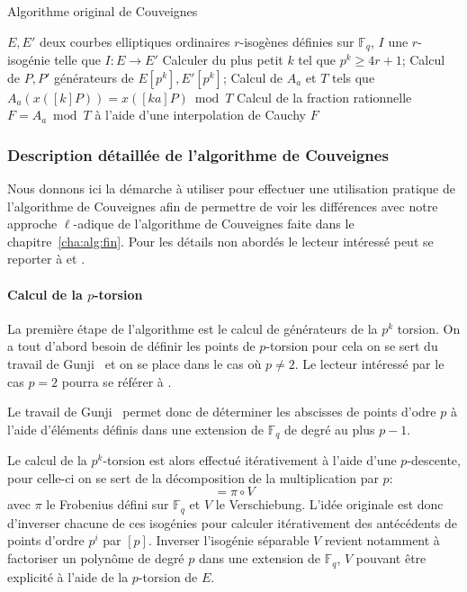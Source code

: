 \documentclass[10pt,a4paper]{book}
\theoremstyle{plain}
\theoremstyle{definition}
\theoremstyle{definition}
\theoremstyle{definition}
\theoremstyle{definition}
\theoremstyle{definition}
\theoremstyle{remark}
\theoremstyle{remark}
\theoremstyle{definition}
\begin{document}
\begin{algorithm}
\caption{\label{alg:orig:Couv} Algorithme original de Couveignes}
\begin{algorithmic}[1]
\REQUIRE $E,E'$ deux courbes elliptiques ordinaires $r$-isogènes définies sur $\mathbb{F}_q$,%
\ENSURE $I$ une $r$-isogénie telle que $I:E \rightarrow E'$
\STATE Calculer du plus petit $k$ tel que $p^k \geqslant 4r+1$;
\STATE Calcul de $P,P'$ générateurs de $E[p^k],E'[p^k]$;
\STATE Calcul de $A_a$ et $T$ tels que $A_a(x([k]P))=x([ka]P) \bmod T$
\STATE Calcul de la fraction rationnelle $F=A_a \bmod T$ à l'aide d'une 
interpolation de Cauchy
\RETURN $F$
\ENDIF
\ENDFOR
\end{algorithmic}
\end{algorithm}

\subsubsection{Description détaillée de l'algorithme de Couveignes }
Nous donnons ici la démarche à utiliser pour effectuer une utilisation 
pratique de l'algorithme de Couveignes afin de permettre de voir les différences
avec notre approche $\ell$-adique de l'algorithme de Couveignes faite dans le
chapitre~\ref{cha:alg:fin}. Pour les détails non abordés le lecteur intéressé 
peut se reporter à \cite{Couveignes96} et \cite{DeFeo11}.

\paragraph{Calcul de la $p$-torsion}
La première étape de l'algorithme est le calcul de générateurs de la $p^k$ 
torsion. On a tout d'abord besoin de définir les points de $p$-torsion pour 
cela on se sert du travail de Gunji~\cite{Gunji76} et on se place dans le cas 
où $p \neq 2$. Le lecteur intéressé par le cas $p=2$ pourra se référer à 
\cite[§3.2]{DeFeo11}.

Le travail de Gunji~\cite[Theorem 4]{Gunji76} permet donc de déterminer les 
abscisses de points d'odre $p$ à l'aide d'éléments définis dans une extension 
de $\mathbb{F}_q$ de degré au plus $p-1$.  

Le calcul de la $p^k$-torsion est alors effectué itérativement à l'aide d'une 
$p$-descente, pour celle-ci on se sert de la décomposition de la multiplication
par $p$: 
\begin{equation}
[p]=\pi \circ V
\end{equation}
avec $\pi$ le Frobenius défini sur $\mathbb{F}_q$ et $V$ le Verschiebung. 
L'idée originale est donc d'inverser chacune  de ces isogénies pour calculer 
itérativement des antécédents de points d'ordre $p^i$ par $[p]$. Inverser 
l'isogénie séparable $V$ revient notamment à factoriser un polynôme de degré 
$p$ dans une extension de $\mathbb{F}_q$, $V$ pouvant être explicité à l'aide 
de la $p$-torsion de $E$. 
\end{document}
